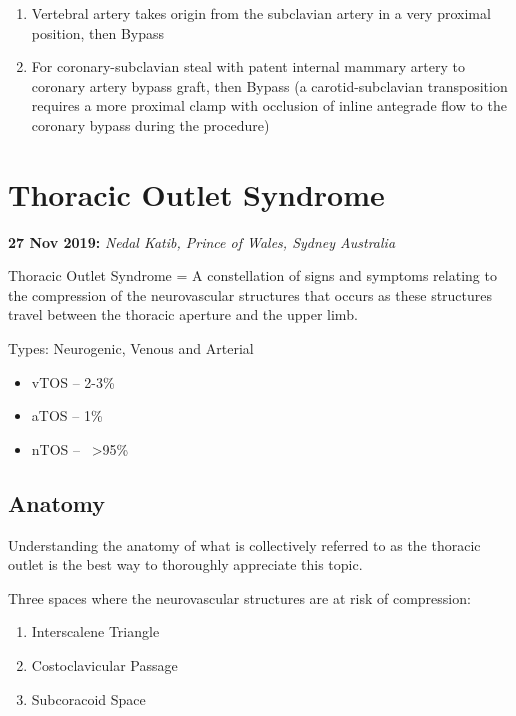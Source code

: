 \documentclass[
]{book}
\begin{document}
\begin{enumerate}
\def\labelenumi{\arabic{enumi}.}
\item
  Vertebral artery takes origin from the subclavian artery in a very
  proximal position, then Bypass
\item
  For coronary-subclavian steal with patent internal mammary artery to
  coronary artery bypass graft, then Bypass (a carotid-subclavian
  transposition requires a more proximal clamp with occlusion of
  inline antegrade flow to the coronary bypass during the procedure)
\end{enumerate}

\hypertarget{thoracic-outlet-syndrome}{%
\chapter{Thoracic Outlet Syndrome}\label{thoracic-outlet-syndrome}}

\textbf{27 Nov 2019:} \emph{Nedal Katib, Prince of Wales, Sydney Australia}

Thoracic Outlet Syndrome = A constellation of signs and symptoms
relating to the compression of the neurovascular structures that occurs
as these structures travel between the thoracic aperture and the upper
limb.

Types: Neurogenic, Venous and Arterial~

\begin{itemize}
\item
  vTOS -- 2-3\%
\item
  aTOS -- 1\%
\item
  nTOS --~ \textgreater95\% \citet{humphries124ThoracicOutlet2019}
\end{itemize}

\hypertarget{anatomy}{%
\section{Anatomy}\label{anatomy}}

Understanding the anatomy of what is collectively referred to as the
thoracic outlet is the best way to thoroughly appreciate this topic.

Three spaces where the neurovascular structures are at risk of
compression:

\begin{enumerate}
\def\labelenumi{\arabic{enumi}.}
\item
  Interscalene Triangle~
\item
  Costoclavicular Passage~\citet{garygwindAnatomicExposuresVascular2013}
\item
  Subcoracoid Space \citet{garygwindAnatomicExposuresVascular2013}
\end{enumerate}
\end{document}
